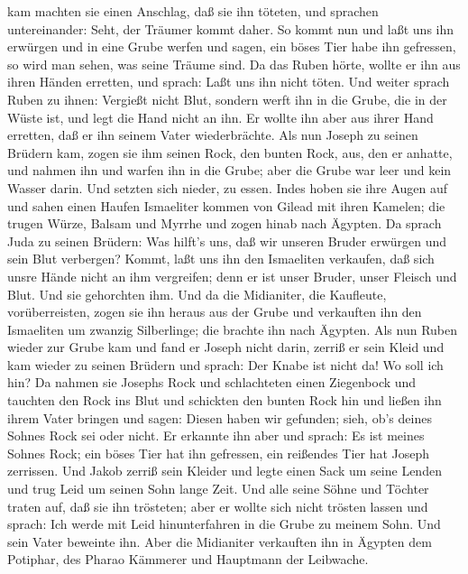 kam machten sie einen Anschlag, daß sie ihn töteten,  und
sprachen untereinander: Seht, der Träumer kommt daher.  So
kommt nun und laßt uns ihn erwürgen und in eine Grube werfen und sagen,
ein böses Tier habe ihn gefressen, so wird man sehen, was seine Träume
sind.  Da das Ruben hörte, wollte er ihn aus ihren Händen
erretten, und sprach: Laßt uns ihn nicht töten.  Und weiter
sprach Ruben zu ihnen: Vergießt nicht Blut, sondern werft ihn in die
Grube, die in der Wüste ist, und legt die Hand nicht an ihn. Er wollte
ihn aber aus ihrer Hand erretten, daß er ihn seinem Vater wiederbrächte.
 Als nun Joseph zu seinen Brüdern kam, zogen sie ihm seinen
Rock, den bunten Rock, aus, den er anhatte,  und nahmen ihn
und warfen ihn in die Grube; aber die Grube war leer und kein Wasser
darin.  Und setzten sich nieder, zu essen. Indes hoben sie
ihre Augen auf und sahen einen Haufen Ismaeliter kommen von Gilead mit
ihren Kamelen; die trugen Würze, Balsam und Myrrhe und zogen hinab nach
Ägypten.  Da sprach Juda zu seinen Brüdern: Was hilft's
uns, daß wir unseren Bruder erwürgen und sein Blut verbergen?
 Kommt, laßt uns ihn den Ismaeliten verkaufen, daß sich
unsre Hände nicht an ihm vergreifen; denn er ist unser Bruder, unser
Fleisch und Blut. Und sie gehorchten ihm.  Und da die
Midianiter, die Kaufleute, vorüberreisten, zogen sie ihn heraus aus der
Grube und verkauften ihn den Ismaeliten um zwanzig Silberlinge; die
brachte ihn nach Ägypten.  Als nun Ruben wieder zur Grube
kam und fand er Joseph nicht darin, zerriß er sein Kleid 
und kam wieder zu seinen Brüdern und sprach: Der Knabe ist nicht da! Wo
soll ich hin?  Da nahmen sie Josephs Rock und schlachteten
einen Ziegenbock und tauchten den Rock ins Blut  und
schickten den bunten Rock hin und ließen ihn ihrem Vater bringen und
sagen: Diesen haben wir gefunden; sieh, ob's deines Sohnes Rock sei oder
nicht.  Er erkannte ihn aber und sprach: Es ist meines
Sohnes Rock; ein böses Tier hat ihn gefressen, ein reißendes Tier hat
Joseph zerrissen.  Und Jakob zerriß sein Kleider und legte
einen Sack um seine Lenden und trug Leid um seinen Sohn lange Zeit.
 Und alle seine Söhne und Töchter traten auf, daß sie ihn
trösteten; aber er wollte sich nicht trösten lassen und sprach: Ich
werde mit Leid hinunterfahren in die Grube zu meinem Sohn. Und sein
Vater beweinte ihn.  Aber die Midianiter verkauften ihn in
Ägypten dem Potiphar, des Pharao Kämmerer und Hauptmann der Leibwache.

